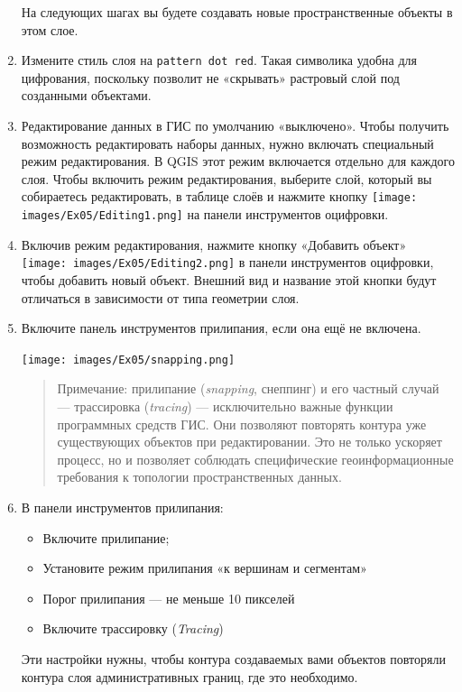 \documentclass[
  12pt,
]{book}
\providecommand{\tightlist}{%
  \setlength{\itemsep}{0pt}\setlength{\parskip}{0pt}}
\begin{document}
\begin{enumerate}
  На следующих шагах вы будете создавать новые пространственные объекты в этом слое.
\item
  Измените стиль слоя на \texttt{pattern\ dot\ red}. Такая символика удобна для цифрования, поскольку позволит не «скрывать» растровый слой под созданными объектами.
\item
  Редактирование данных в ГИС по умолчанию «выключено». Чтобы получить возможность редактировать наборы данных, нужно включать специальный режим редактирования. В QGIS этот режим включается отдельно для каждого слоя. Чтобы включить режим редактирования, выберите слой, который вы собираетесь редактировать, в таблице слоёв и нажмите кнопку \texttt{[image: images/Ex05/Editing1.png]} на панели инструментов оцифровки.
\item
  Включив режим редактирования, нажмите кнопку «Добавить объект» \texttt{[image: images/Ex05/Editing2.png]} в панели инструментов оцифровки, чтобы добавить новый объект. Внешний вид и название этой кнопки будут отличаться в зависимости от типа геометрии слоя.
\item
  Включите панель инструментов прилипания, если она ещё не включена.

  \texttt{[image: images/Ex05/snapping.png]}

  \begin{quote}
  Примечание: прилипание (\emph{snapping}, снеппинг) и его частный случай --- трассировка (\emph{tracing}) --- исключительно важные функции программных средств ГИС. Они позволяют повторять контура уже существующих объектов при редактировании. Это не только ускоряет процесс, но и позволяет соблюдать специфические геоинформационные требования к топологии пространственных данных.
  \end{quote}
\item
  В панели инструментов прилипания:

  \begin{itemize}
  \tightlist
  \item
    Включите прилипание;
  \item
    Установите режим прилипания «к вершинам и сегментам»
  \item
    Порог прилипания --- не меньше 10 пикселей
  \item
    Включите трассировку (\emph{Tracing})
  \end{itemize}

  Эти настройки нужны, чтобы контура создаваемых вами объектов повторяли контура слоя административных границ, где это необходимо.


\end{enumerate}
\end{document}
